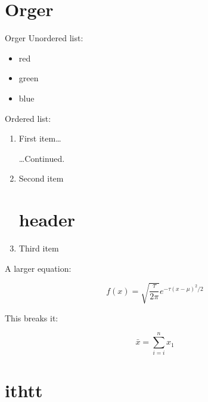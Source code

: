 \documentclass[
  10pt,
  ignorenonframetext,
  aspectratio=43,
]{beamer}
\providecommand{\tightlist}{%
  \setlength{\itemsep}{0pt}\setlength{\parskip}{0pt}}
\begin{document}
\hypertarget{orger}{%
\section{Orger}\label{orger}}

\begin{frame}{Orger}
Unordered list:

\begin{itemize}
\tightlist
\item
  red
\item
  green
\item
  blue
\end{itemize}

Ordered list:

\begin{enumerate}
\item
  First item\ldots{}

  \ldots Continued.
\item
  Second item

  \hypertarget{header}{%
  \section{header}\label{header}}
\item
  Third item
\end{enumerate}

A larger equation:

\[ 
f(x)={\sqrt{\frac{\tau}{2\pi}}}
      e^{-\tau (x-\mu )^{2}/2}
\]

This breaks it:

\[
\bar{x} = \sum_{i=i}^n x_1
\]
\end{frame}

\hypertarget{ithtt}{%
\section{ithtt}\label{ithtt}}
\end{document}
